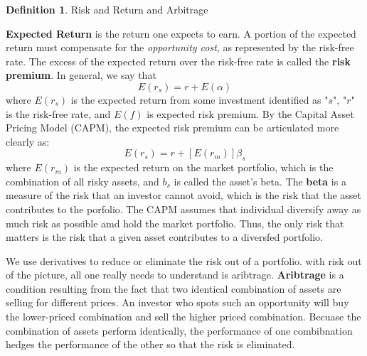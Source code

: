 \documentclass{book}
\theoremstyle{definition}
\newtheorem{definition}{Definition}[section]
\theoremstyle{remark}
\begin{document}
    
    
    
    \begin{definition}{Risk and Return and Arbitrage}
        
        \textbf{Expected Return} is the return one expects to earn. A portion of the expected return must compensate for the \textit{opportunity cost}, as represented by the risk-free rate. The excess of the expected return over the risk-free rate is called the \textbf{risk premium}. In general, we say that 
            \begin{equation}
                E(r_s)= r + E(\alpha)
            \end{equation}
        where $E(r_s)$ is the expected return from some investment identified as "$s$", "$r$" is the risk-free rate, and $E(f)$ is expected risk premium. By the Capital Asset Pricing Model (CAPM), the expected risk premium can be articulated more clearly as: 
            \begin{equation}
                E(r_s) = r + [E(r_m)]\beta_s
            \end{equation}
        where $E(r_m)$ is the expected return on the market portfolio, which is the combination of all risky assets, and $b_s$ is called the asset's beta. The \textbf{beta} is a measure of the risk that an investor cannot avoid, which is the risk that the asset contributes to the porfolio. The CAPM assumes that individual diversify away as much risk as possible amd hold the market portfolio. Thus, the only risk that matters is the risk that a given asset contributes to a diversfed portfolio.
        
        We use derivatives to reduce or eliminate the risk out of a portfolio. with risk out of the picture, all one really needs to understand is aribtrage. \textbf{Aribtrage} is a condition resulting from the fact that two identical combination of assets are selling for different prices. An investor who spots such an opportunity will buy the lower-priced combination and sell the higher priced combination. Becuase the combination of assets perform identically, the performance of one combibnation hedges the performance of the other so that the risk is eliminated. 
    \end{definition}
\end{document}
